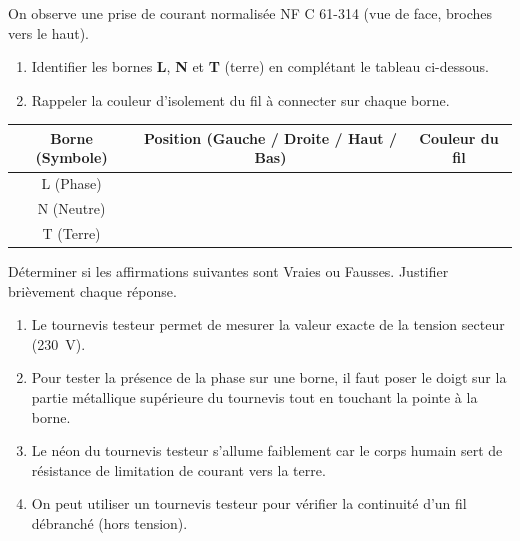 \documentclass[11pt]{article}
\begin{document}
\begin{exercice}
On observe une prise de courant normalisée NF C 61-314 (vue de face, broches vers le haut).
\begin{enumerate}
    \item Identifier les bornes \textbf{L}, \textbf{N} et \textbf{T} (terre) en complétant le tableau ci-dessous.
    \item Rappeler la couleur d'isolement du fil à connecter sur chaque borne.
\end{enumerate}
\begin{tabular}{|c|c|c|}
\hline
\textbf{Borne (Symbole)} & \textbf{Position (Gauche / Droite / Haut / Bas)} & \textbf{Couleur du fil} \\
\hline
L (Phase) & & \\
\hline
N (Neutre) & & \\
\hline
T (Terre) & & \\
\hline
\end{tabular}
\end{exercice}

\begin{exercice}
Déterminer si les affirmations suivantes sont Vraies ou Fausses. Justifier brièvement chaque réponse.
\begin{enumerate}
    \item Le tournevis testeur permet de mesurer la valeur exacte de la tension secteur (\SI{230}{V}).
    \item Pour tester la présence de la phase sur une borne, il faut poser le doigt sur la partie métallique supérieure du tournevis tout en touchant la pointe à la borne.
    \item Le néon du tournevis testeur s'allume faiblement car le corps humain sert de résistance de limitation de courant vers la terre.
    \item On peut utiliser un tournevis testeur pour vérifier la continuité d'un fil débranché (hors tension).
\end{enumerate}
\end{exercice}
\end{document}
